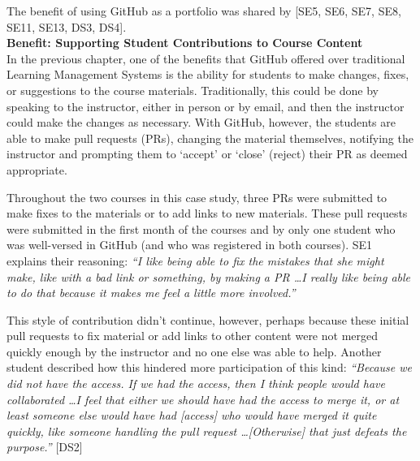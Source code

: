 The benefit of using GitHub as a portfolio was shared by [SE5, SE6, SE7, SE8, SE11, SE13, DS3, DS4]. \\


\textbf{Benefit: Supporting Student Contributions to Course Content} \\
In the previous chapter, one of the benefits that GitHub offered over traditional Learning Management Systems is the ability for students to make changes, fixes, or suggestions to the course materials. Traditionally, this could be done by speaking to the instructor, either in person or by email, and then the instructor could make the changes as necessary. With GitHub, however, the students are able to make pull requests (PRs), changing the material themselves, notifying the instructor and prompting them to `accept' or `close' (reject) their PR as deemed appropriate.

Throughout the two courses in this case study, three PRs were submitted to make fixes to the materials or to add links to new materials. These pull requests were submitted in the first month of the courses and by only one student who was well-versed in GitHub (and who was registered in both courses). SE1 explains their reasoning: \textit{``I like being able to fix the mistakes that she might make, like with a bad link or something, by making a PR \ldots I really like being able to do that because it makes me feel a little more involved.''}

This style of contribution didn't continue, however, perhaps because these initial pull requests to fix material or add links to other content were not merged quickly enough by the instructor and no one else was able to help. Another student described how this hindered more participation of this kind: \textit{``Because we did not have the access. If we had the access, then I think people would have collaborated \ldots I feel that either we should have had the access to merge it, or at least someone else would have had [access] who would have merged it quite quickly, like someone handling the pull request \ldots [Otherwise] that just defeats the purpose.''} [DS2]

